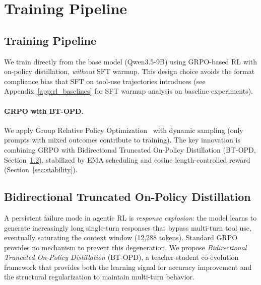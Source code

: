 \documentclass{article}
\begin{document}
\section{Training Pipeline}
\label{sec:training}

\subsection{Training Pipeline}
\label{sec:pipeline}

We train directly from the base model (Qwen3.5-9B) using GRPO-based RL with on-policy distillation, \emph{without} SFT warmup. This design choice avoids the format compliance bias that SFT on tool-use trajectories introduces (see Appendix~\ref{app:rl_baselines} for SFT warmup analysis on baseline experiments).

\paragraph{GRPO with BT-OPD.}
We apply Group Relative Policy Optimization~\citep{shao2024deepseekmath} with dynamic sampling (only prompts with mixed outcomes contribute to training). The key innovation is combining GRPO with Bidirectional Truncated On-Policy Distillation (BT-OPD, Section~\ref{sec:opd}), stabilized by EMA scheduling and cosine length-controlled reward (Section~\ref{sec:stability}).


\subsection{Bidirectional Truncated On-Policy Distillation}
\label{sec:opd}

A persistent failure mode in agentic RL is \emph{response explosion}: the model learns to generate increasingly long single-turn responses that bypass multi-turn tool use, eventually saturating the context window (12,288 tokens). Standard GRPO provides no mechanism to prevent this degeneration. We propose \emph{Bidirectional Truncated On-Policy Distillation} (BT-OPD), a teacher-student co-evolution framework that provides both the learning signal for accuracy improvement and the structural regularization to maintain multi-turn behavior.
\end{document}

